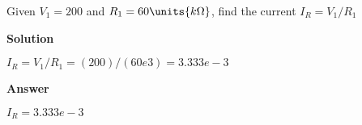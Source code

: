 
\question Given $V_1 = 200$  and \mbox{$R_{1}=\mbox{$60 \units{k \Omega}$}$}, find the current  $I_R = V_1/R_1$


\begin{solutions}
\textbf{Solution}

\mbox{$I_{R}=V_{1}/R_{1}  = (200)/(60e3) = 3.333e-3$}\\
\end{solutions}


\begin{answers}
\textbf{Answer}

\mbox{$I_{R}=3.333e-3$}
\end{answers}

